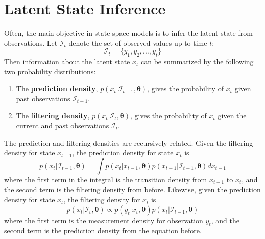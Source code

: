 \documentclass[11pt, oneside]{scrreprt}   	%
\begin{document}
\section{Latent State Inference}
Often, the main objective in state space models is to infer the latent state from observations. Let $\mathcal{I}_t$ denote the set of observed values up to time $t$:
$$
\mathcal{I}_t = \{y_1, y_2, \ldots, y_t\}
$$ 
Then information about the latent state $x_t$ can be summarized by the following two probability distributions:
\begin{enumerate}
	\item The \textbf{prediction density}, $p(x_{t} | \mathcal{I}_{t-1}, \boldsymbol{\theta})$, gives the probability of $x_t$ given past observations  $\mathcal{I}_{t-1}$.
	\item The \textbf{filtering density}, $p(x_{t} | \mathcal{I}_{t}, \boldsymbol{\theta})$, gives the probability of $x_t$ given the current and past observations  $\mathcal{I}_{t}$.
\end{enumerate}	
The prediction and filtering densities are recursively related. Given the filtering density for state $x_{t-1}$, the prediction density for state $x_t$ is
$$
p(x_{t} | \mathcal{I}_{t-1}, \boldsymbol{\theta}) = \int p(x_t | x_{t-1}, \boldsymbol{\theta}) p(x_{t-1} | \mathcal{I}_{t-1}, \boldsymbol{\theta}) dx_{t-1}
$$
where the first term in the integral is the transition density from $x_{t-1}$ to $x_t$, and the second term is the filtering density from before. Likewise, given the prediction density for state $x_t$, the filtering density for $x_t$ is
$$
p(x_{t} | \mathcal{I}_{t}, \boldsymbol{\theta}) \propto p(y_t | x_{t}, \boldsymbol{\theta}) p(x_{t} | \mathcal{I}_{t-1}, \boldsymbol{\theta}) 
$$
where the first term is the measurement density for observation $y_t$, and the second term is the prediction density from the equation before.

\end{document}
